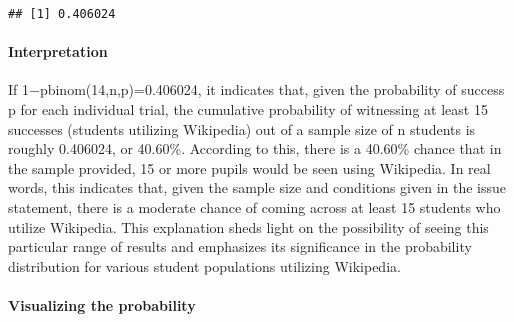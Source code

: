 \documentclass[
]{article}
\begin{document}
\begin{verbatim}
## [1] 0.406024
\end{verbatim}

\paragraph{Interpretation}\label{interpretation-8}

If 1−pbinom(14,n,p)=0.406024, it indicates that, given the probability
of success p for each individual trial, the cumulative probability of
witnessing at least 15 successes (students utilizing Wikipedia) out of a
sample size of n students is roughly 0.406024, or 40.60\%. According to
this, there is a 40.60\% chance that in the sample provided, 15 or more
pupils would be seen using Wikipedia. In real words, this indicates
that, given the sample size and conditions given in the issue statement,
there is a moderate chance of coming across at least 15 students who
utilize Wikipedia. This explanation sheds light on the possibility of
seeing this particular range of results and emphasizes its significance
in the probability distribution for various student populations
utilizing Wikipedia.

\paragraph{Visualizing the
probability}\label{visualizing-the-probability-3}
\end{document}
